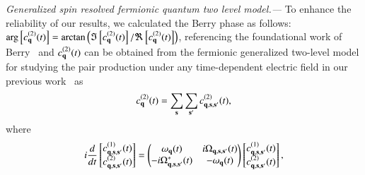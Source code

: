 \documentclass[prl,twocolumn,floatfix,amsmath,nofootinbib,superscriptaddress,amssymb,preprintnumbers,floatfix]{revtex4-1}
\begin{document}
\emph{Generalized spin resolved fermionic quantum two level model.---}
To enhance the reliability of our results, we calculated the Berry phase as follows: $\arg\left[c_{\bf{q}}^{(2)}(t)\right]= {\rm arctan}\left(\Im\left[c_{\bf{q}}^{(2)}(t)\right]/\Re\left[c_{\bf{q}}^{(2)}(t)\right]\right)$, referencing the foundational work of Berry~\cite{Berry:1984jv,PhysRevA.61.032110} and $c_{\bf{q}}^{(2)}(t)$ can be obtained from the fermionic generalized two-level model  for studying the pair production under any time-dependent electric field in our previous work~\cite{Amat:2024nvg} as 
\begin{eqnarray}\label{eq:2}
c_{\bf{q}}^{(2)}(t)=\sum_{\bf s} \sum_{\bf s'} c_{\bf{q},\bf{s},\bf{s}'}^{(2)}(t),
\end{eqnarray}
where
\begin{equation}\label{eq:3}
i\frac{d}{dt}\begin{bmatrix}
c_{\bf{q},\bf{s},\bf{s}'}^{(1)}(t)\\
c_{\bf{q},\bf{s},\bf{s}'}^{(2)}(t)
\end{bmatrix}
=
\begin{pmatrix} \omega_{\bf{q}}(t) & i\Omega_{\bf{q},\bf{s},\bf{s}'}(t) \cr -i\Omega^*_{\bf{q},\bf{s},\bf{s}'}(t) & -\omega_{\bf{q}}(t) \end{pmatrix}
\begin{bmatrix}
c_{\bf{q},\bf{s},\bf{s}'}^{(1)}(t)\\
c_{\bf{q},\bf{s},\bf{s}'}^{(2)}(t)
\end{bmatrix},
\end{equation}
\end{document}
